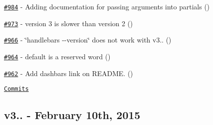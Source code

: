 \begin{DoxyItemize}
\item \href{https://github.com/wycats/handlebars.js/pull/984}{\tt \#984} -\/ Adding documentation for passing arguments into partials (\href{https://api.github.com/users/johneke}{\tt })
\item \href{https://github.com/wycats/handlebars.js/issues/973}{\tt \#973} -\/ version 3 is slower than version 2 (\href{https://api.github.com/users/elover}{\tt })
\item \href{https://github.com/wycats/handlebars.js/issues/966}{\tt \#966} -\/ \char`\"{}handlebars -\/-\/version\char`\"{} does not work with v3.. (\href{https://api.github.com/users/abloomston}{\tt })
\item \href{https://github.com/wycats/handlebars.js/pull/964}{\tt \#964} -\/ default is a reserved word (\href{https://api.github.com/users/grassick}{\tt })
\item \href{https://github.com/wycats/handlebars.js/pull/962}{\tt \#962} -\/ Add dashbars\textquotesingle{} link on R\+E\+A\+D\+M\+E. (\href{https://api.github.com/users/pismute}{\tt })
\end{DoxyItemize}

\href{https://github.com/wycats/handlebars.js/compare/v3.0.0...v3.0.1}{\tt Commits}

\subsection*{v3.. -\/ February 10th, 2015}



